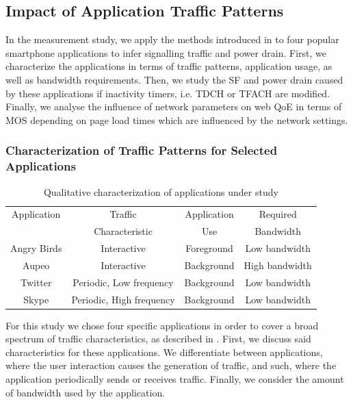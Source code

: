 \subsection{Impact of Application Traffic Patterns}\label{sec:network:network_traces:numerical_results}
In the measurement study, we apply the methods introduced in  to four popular smartphone
applications to infer signalling traffic and power drain.
First, we characterize the applications in terms of traffic patterns, application usage, as well as bandwidth requirements.
Then, we study the \gls{SF} and power drain caused by these applications if inactivity timers, i.e. \gls{TDCH} or \gls{TFACH} are modified.
Finally, we analyse the influence of network parameters on web \gls{QoE} in terms of \gls{MOS} depending on page load times which are influenced by the network settings.

\subsubsection*{Characterization of Traffic Patterns for Selected Applications}\label{sec:network:network_traces:numerical_results:traffic_characterization}

\begin{table}
  \centering
  \caption{Qualitative characterization of applications under study}
  \label{tab:network:network_traces:numerical_results:app_characterization}
  \begin{tabular}{cccc}
  	\toprule
    Application&Traffic&Application&Required\\
    &Characteristic&Use&Bandwidth\\
    \midrule
    Angry Birds & Interactive & Foreground & Low bandwidth \\
    Aupeo & Interactive & Background & High bandwidth\\
    Twitter & Periodic, Low frequency & Background & Low bandwidth\\
    Skype & Periodic, High frequency& Background & Low bandwidth\\
    \bottomrule
  \end{tabular}
\end{table}

For this study we chose four specific applications in order to cover a broad spectrum of traffic characteristics, as described in .
First, we discuss said characteristics for these applications.
We differentiate between applications, where the user interaction causes the generation of traffic, and such, where the application periodically sends or receives traffic.
Finally, we consider the amount of bandwidth used by the application.

